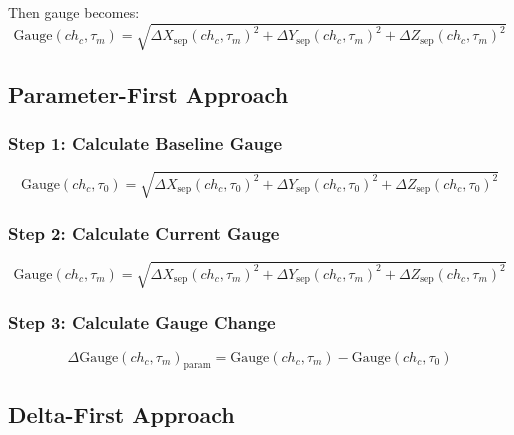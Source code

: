 \documentclass{article}
\newcommand{\chainage}[1]{ch_{#1}}
\newcommand{\Gauge}[2]{\text{Gauge}(#1, #2)}
\newcommand{\DGauge}[2]{\Delta\text{Gauge}(#1, #2)}
\newcommand{\SepX}[2]{\Delta X_{\text{sep}}(#1, #2)}
\newcommand{\SepY}[2]{\Delta Y_{\text{sep}}(#1, #2)}
\newcommand{\SepZ}[2]{\Delta Z_{\text{sep}}(#1, #2)}
\begin{document}
Then gauge becomes:
\begin{equation}
\Gauge{\chainage{c}}{\tau_m} = \sqrt{\SepX{\chainage{c}}{\tau_m}^2 + \SepY{\chainage{c}}{\tau_m}^2 + \SepZ{\chainage{c}}{\tau_m}^2}
\end{equation}

\subsection{Parameter-First Approach}

\subsubsection{Step 1: Calculate Baseline Gauge}
\begin{equation}
\Gauge{\chainage{c}}{\tau_0} = \sqrt{\SepX{\chainage{c}}{\tau_0}^2 + \SepY{\chainage{c}}{\tau_0}^2 + \SepZ{\chainage{c}}{\tau_0}^2}
\end{equation}

\subsubsection{Step 2: Calculate Current Gauge}
\begin{equation}
\Gauge{\chainage{c}}{\tau_m} = \sqrt{\SepX{\chainage{c}}{\tau_m}^2 + \SepY{\chainage{c}}{\tau_m}^2 + \SepZ{\chainage{c}}{\tau_m}^2}
\end{equation}

\subsubsection{Step 3: Calculate Gauge Change}
\begin{equation}
\DGauge{\chainage{c}}{\tau_m}_{\text{param}} = \Gauge{\chainage{c}}{\tau_m} - \Gauge{\chainage{c}}{\tau_0}
\end{equation}

\subsection{Delta-First Approach}
\end{document}
